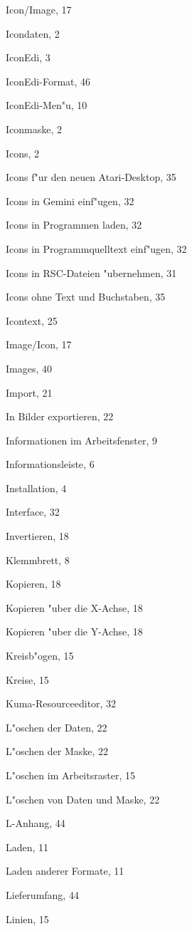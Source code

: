 \begin{theindex}
  \item Icon/Image, 17
  \item Icondaten, 2
  \item IconEdi, 3
  \item IconEdi-Format, 46
  \item IconEdi-Men"u, 10
  \item Iconmaske, 2
  \item Icons, 2
  \item Icons f"ur den neuen Atari-Desktop, 35
  \item Icons in Gemini einf"ugen, 32
  \item Icons in Programmen laden, 32
  \item Icons in Programmquelltext einf"ugen, 32
  \item Icons in RSC-Dateien "ubernehmen, 31
  \item Icons ohne Text und Buchstaben, 35
  \item Icontext, 25
  \item Image/Icon, 17
  \item Images, 40
  \item Import, 21
  \item In Bilder exportieren, 22
  \item Informationen im Arbeitsfenster, 9
  \item Informationsleiste, 6
  \item Installation, 4
  \item Interface, 32
  \item Invertieren, 18

  \indexspace

  \item Klemmbrett, 8
  \item Kopieren, 18
  \item Kopieren "uber die X-Achse, 18
  \item Kopieren "uber die Y-Achse, 18
  \item Kreisb"ogen, 15
  \item Kreise, 15
  \item Kuma-Resourceeditor, 32

  \indexspace

  \item L"oschen der Daten, 22
  \item L"oschen der Maske, 22
  \item L"oschen im Arbeitsraster, 15
  \item L"oschen von Daten und Maske, 22
  \item L-Anhang, 44
  \item Laden, 11
  \item Laden anderer Formate, 11
  \item Lieferumfang, 44
  \item Linien, 15


\end{theindex}
